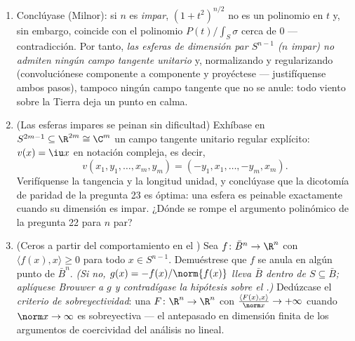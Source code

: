 \begin{problem}
\begin{enumerate}[resume]
\[        \qquad\text{con el signo } + \text{ para } t \text{ pequeño}
        \]
        ( conservada por
         desde $t = 0$).
        \item Conclúyase (Milnor): si $n$ es \emph{impar}, $(1 +
        t^2)^{n/2}$ no es un polinomio en $t$ y, sin embargo, coincide
        con el polinomio $P(t)/\int_S\sigma$ cerca de $0$ ---
        contradicción. Por tanto, \emph{las esferas de dimensión par
        $S^{n-1}$ ($n$ impar) no admiten ningún campo tangente unitario}
        y, normalizando y regularizando (convoluciónese componente a
        componente y proyéctese --- justifíquense ambos pasos), tampoco
        ningún campo tangente
         que no se anule:
        todo viento sobre la Tierra deja un punto en calma.

  \item (Las esferas impares se peinan sin dificultad) Exhíbase en
  $S^{2m-1}
        \subseteq \R^{2m} \cong \C^m$ un campo tangente unitario regular
  explícito: $v(x) = \iu x$ en notación compleja, es decir,
        \[
        v(x_1, y_1, \dots, x_m, y_m) =
        (-y_1, x_1, \dots, -y_m, x_m) .
        \]
        Verifíquense la tangencia y la longitud unidad, y conclúyase que
        la dicotomía de paridad de la pregunta 23 es óptima: una esfera
        es peinable exactamente cuando su dimensión es impar. ¿Dónde se
        rompe el argumento polinómico de la pregunta 22 para $n$ par?
        \item (Ceros a partir del comportamiento en el
        ) Sea $f \colon \bar
        B^n \to \R^n$  con
        $\langle f(x),
        x\rangle \geq 0$ para todo $x \in S^{n-1}$. Demuéstrese que $f$
        se anula en algún punto de $\bar B^n$. \emph{(Si no,
        $g(x) = -f(x)/\norm{f(x)}$ lleva $\bar B$
         dentro de
        $S \subseteq \bar B$; aplíquese Brouwer a $g$ y contradígase la
        hipótesis sobre el .)}
        Dedúzcase el \emph{criterio de sobreyectividad}: una
        $F\colon\R^n\to\R^n$ con
        $\frac{\langle F(x), x\rangle}{\norm x} \to
        +\infty$ cuando $\norm x \to \infty$ es sobreyectiva --- el
        antepasado en dimensión finita de los argumentos de coercividad
        del análisis no lineal.
\end{enumerate}
\end{problem}
